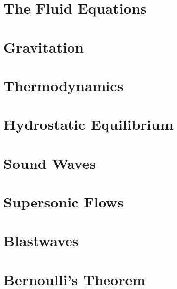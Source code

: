 \documentclass[11pt,fleqn]{book} %
\begin{document}
\chapter{The Fluid Equations}

\chapter{Gravitation}

\chapter{Thermodynamics}

\chapter{Hydrostatic Equilibrium}

\chapter{Sound Waves}

\chapter{Supersonic Flows}

\chapter{Blastwaves}

\chapter{Bernoulli's Theorem}

\end{document}
